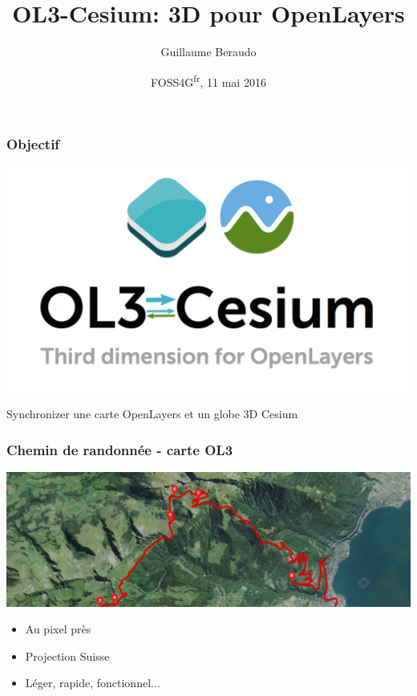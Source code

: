 \documentclass{beamer}
\title{OL3-Cesium: 3D pour OpenLayers}
\author{Guillaume Beraudo}
\institute{Ingénieur Opensource \\Camptocamp, Suisse}
\date{FOSS4G\textsuperscript{fr}, 11 mai 2016}
\begin{document}
  \begin{frame}
    \titlepage
  \end{frame}

  \begin{frame}
       \frametitle{Objectif}
    \begin{center}
        \includegraphics[width=.3\linewidth]{./ol3-cesium-wide_arrows.png}
    \end{center}

\begin{center}
    Synchronizer une carte OpenLayers et un globe 3D Cesium
\end{center}
\end{frame}


  \begin{frame}
    \frametitle{Chemin de randonnée - carte OL3}
	\begin{center}
	  \includegraphics[width=1.0 \linewidth]{./vtt_2d_half.png}
	\end{center}

	\pause
	\begin{itemize}
      \item Au pixel près
      \item Projection Suisse
      \item Léger, rapide, fonctionnel...
    \end{itemize}
  \end{frame}
 
\end{document}
